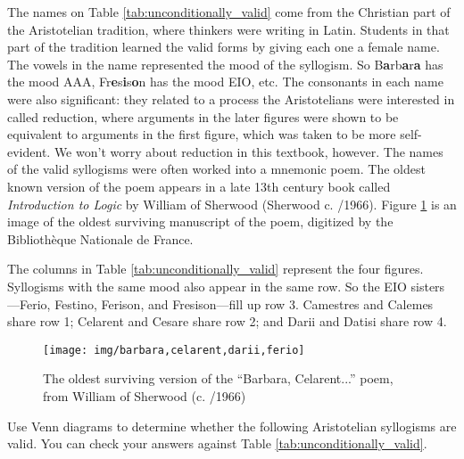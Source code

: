 The names on Table \ref{tab:unconditionally_valid} come from the Christian part of the Aristotelian tradition, where thinkers were writing in Latin. Students in that part of the tradition learned the valid forms by giving each one a female name. The vowels in the name represented the mood of the syllogism. So B\textbf{a}rb\textbf{a}r\textbf{a} has the mood AAA, Fr\textbf{e}s\textbf{i}s\textbf{o}n has the mood EIO, etc. The consonants in each name were also significant: they related to a process the Aristotelians were interested in called reduction, where arguments in the later figures were shown to be equivalent to arguments in the first figure, which was taken to be more self-evident. We won't worry about reduction in this textbook, however. The names of the valid syllogisms were often worked into a mnemonic poem. The oldest known version of the poem appears in a late 13th century book called \textit{Introduction to Logic} by William of Sherwood (Sherwood c. \citeyear{sherwood1275}/1966). Figure \ref{fig:barbara,celarent} is an image of the oldest surviving manuscript of the poem, digitized by the Bibliothèque Nationale de France.

The columns in Table \ref{tab:unconditionally_valid} represent the four figures. Syllogisms with the same mood also appear in the same row. So the EIO sisters---Ferio, Festino, Ferison, and Fresison---fill up row 3.  Camestres and Calemes share row 1;  Celarent and Cesare share row 2; and Darii and Datisi share row 4.   

\begin{figure}
\begin{mdframed}[style=mytableclearbox]
\texttt{[image: img/barbara,celarent,darii,ferio]} 
\end{mdframed}
\caption{The oldest surviving version of the ``Barbara, Celarent...'' poem, from William of Sherwood (c. \citeyear{sherwood1275}/1966)}
\label{fig:barbara,celarent}
\end{figure}



\practiceproblems
\label{venn_proofs}
\problempart Use Venn diagrams to determine whether the following Aristotelian syllogisms are valid. You can check your answers against Table \ref{tab:unconditionally_valid}.

